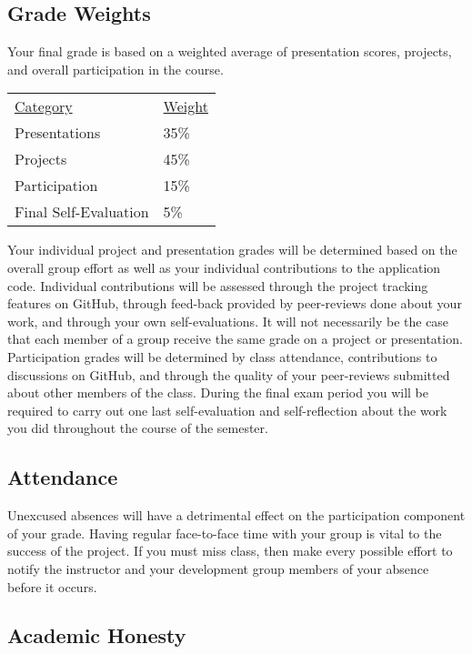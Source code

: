 \documentclass[10pt]{article}
\begin{document}
\subsection{Grade Weights}

Your final grade is based on a weighted average of presentation scores, projects, and overall participation in the course.

\begin{center}
  \begin{tabular}{ll}
  \underline{Category} & \underline{Weight} \\
    Presentations & 35\% \\
    Projects & 45\% \\
    Participation & 15\% \\
    Final Self-Evaluation & 5\%
  \end{tabular}
\end{center}

Your individual project and presentation grades will be determined based on the overall group effort as well as your individual contributions to the application code. Individual contributions will be assessed through the project tracking features on GitHub, through feed-back provided by peer-reviews done about your work, and through your own self-evaluations. It will not necessarily be the case that each member of a group receive the same grade on a project or presentation.  Participation grades will be determined by class attendance, contributions to discussions on GitHub, and through the quality of your peer-reviews submitted about other members of the class. During the final exam period you will be required to carry out one last self-evaluation and self-reflection about the work you did throughout the course of the semester.


\subsection{Attendance}

Unexcused absences will have a detrimental effect on the participation component of your grade. Having regular face-to-face time with your group is vital to the success of the project. If you must miss class, then make every possible effort to notify the instructor and your development group members of your absence before it occurs.

\subsection{Academic Honesty}
\end{document}
